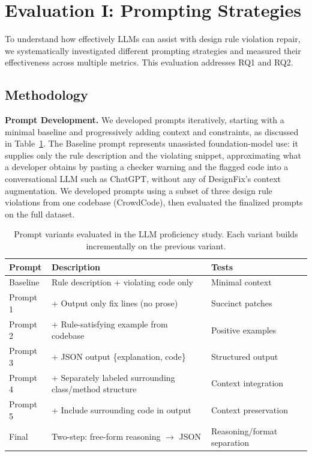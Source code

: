 \section{Evaluation I: Prompting Strategies}
\label{sec:evaluation-one}
To understand how effectively LLMs can assist with design rule violation repair, we systematically investigated different prompting strategies and measured their effectiveness across multiple metrics. This evaluation addresses RQ1 and RQ2.

\subsection{Methodology}
\label{sec:evaluation-one-method}
\textbf{Prompt Development.} We developed prompts iteratively, starting with a minimal baseline and progressively adding context and constraints, as discussed in Table~\ref{tab:prompts}. The Baseline prompt represents unassisted foundation-model use: it supplies only the rule description and the violating snippet, approximating what a developer obtains by pasting a checker warning and the flagged code into a conversational LLM such as ChatGPT, without any of DesignFix's context augmentation. We developed prompts using a subset of three design rule violations from one codebase (CrowdCode), then evaluated the finalized prompts on the full dataset.

\begin{table}[t]
  \caption{Prompt variants evaluated in the LLM proficiency study.
  Each variant builds incrementally on the previous variant.}
  \label{tab:prompts}
  \centering
  \begin{tabular}{lll}
    \toprule
    \textbf{Prompt} & \textbf{Description} & \textbf{Tests} \\
    \midrule
    Baseline & Rule description + violating code only & Minimal context \\
    Prompt 1 & + Output only fix lines (no prose) & Succinct patches \\
    Prompt 2 & + Rule-satisfying example from codebase & Positive examples \\
    Prompt 3 & + JSON output \{explanation, code\} & Structured output \\
    Prompt 4 & + Separately labeled surrounding class/method structure
             & Context integration \\
    Prompt 5 & + Include surrounding code in output
             & Context preservation \\
    \midrule
    Final & Two-step: free-form reasoning $\rightarrow$ JSON
          & Reasoning/format separation \\
    \bottomrule
  \end{tabular}
\end{table}

